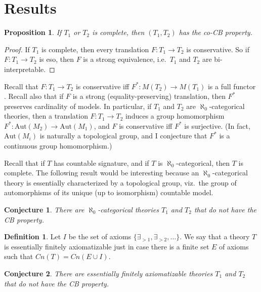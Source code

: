 \documentclass[12pt]{article}
\newtheorem*{conj}{Conjecture}
\newtheorem*{prop}{Proposition}
\theoremstyle{definition}
\newtheorem*{defn}{Definition}
\newcommand{\3}{\mathcal}
\begin{document}
\section{Results}

\begin{prop} If $T_1$ or $T_2$ is complete, then $(T_1,T_2)$ has the
  co-CB property. \end{prop}

\begin{proof} If $T_1$ is complete, then every translation
  $F:T_1\to T_2$ is conservative. So if $F:T_1\to T_2$ is eso, then
  $F$ is a strong equivalence, i.e.\ $T_1$ and $T_2$ are
  bi-interpretable. \end{proof}

Recall that $F:T_1\to T_2$ is conservative iff $F^*:M(T_2)\to M(T_1)$
is a full functor \citep{barrett2020}. Recall also that if $F$ is a
strong (equality-preserving) translation, then $F^*$ preserves
cardinality of models. In particular, if $T_1$ and $T_2$ are
$\aleph _0$-categorical theories, then a translation $F:T_1\to T_2$
induces a group homomorphism
$F^*:\mathrm{Aut}(M_2)\to \mathrm{Aut}(M_1)$, and $F$ is conservative
iff $F^*$ is surjective. (In fact, $\mathrm{Aut}(M_i)$ is naturally a
topological group, and I conjecture that $F^*$ is a continuous group
homomorphism.)

Recall that if $T$ has countable signature, and if $T$ is
$\aleph _0$-categorical, then $T$ is complete. The following result
would be interesting because an $\aleph _0$-categorical theory is
essentially characterized by a topological group, viz.\ the group of
automorphisms of its unique (up to isomorphism) countable model.


\begin{conj} There are $\aleph _0$-categorical theories $T_1$ and
  $T_2$ that do not have the CB property. \end{conj}

\begin{defn} Let $I$ be the set of axioms
  $\{ \exists _{>1},\exists _{>2},\dots \}$. We say that a theory $T$
  is essentially finitely axiomatizable just in case there is a finite
  set $E$ of axioms such that $Cn(T)=Cn(E\cup I)$. \end{defn}

\begin{conj} There are essentially finitely axiomatizable theories
  $T_1$ and $T_2$ that do not have the CB property. \end{conj}
\end{document}
